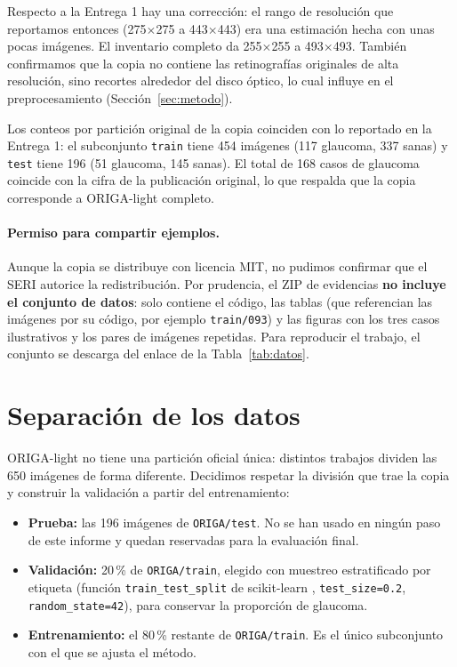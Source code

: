 \documentclass[pdflatex,sn-mathphys-num]{sn-jnl}%
\theoremstyle{thmstyleone}%
\theoremstyle{thmstyletwo}%
\theoremstyle{thmstylethree}%
\begin{document}
Respecto a la Entrega 1 hay una corrección: el rango de resolución que reportamos entonces (275$\times$275 a 443$\times$443) era una estimación hecha con unas pocas imágenes. El inventario completo da 255$\times$255 a 493$\times$493. También confirmamos que la copia no contiene las retinografías originales de alta resolución, sino recortes alrededor del disco óptico, lo cual influye en el preprocesamiento (Sección~\ref{sec:metodo}).

Los conteos por partición original de la copia coinciden con lo reportado en la Entrega 1: el subconjunto \texttt{train} tiene 454 imágenes (117 glaucoma, 337 sanas) y \texttt{test} tiene 196 (51 glaucoma, 145 sanas). El total de 168 casos de glaucoma coincide con la cifra de la publicación original, lo que respalda que la copia corresponde a ORIGA-light completo.

\paragraph{Permiso para compartir ejemplos.} Aunque la copia se distribuye con licencia MIT, no pudimos confirmar que el SERI autorice la redistribución. Por prudencia, el ZIP de evidencias \textbf{no incluye el conjunto de datos}: solo contiene el código, las tablas (que referencian las imágenes por su código, por ejemplo \texttt{train/093}) y las figuras con los tres casos ilustrativos y los pares de imágenes repetidas. Para reproducir el trabajo, el conjunto se descarga del enlace de la Tabla~\ref{tab:datos}.

\section{Separación de los datos}\label{sec:particion}

ORIGA-light no tiene una partición oficial única: distintos trabajos dividen las 650 imágenes de forma diferente. Decidimos respetar la división que trae la copia y construir la validación a partir del entrenamiento:

\begin{itemize}
\item \textbf{Prueba:} las 196 imágenes de \texttt{ORIGA/test}. No se han usado en ningún paso de este informe y quedan reservadas para la evaluación final.
\item \textbf{Validación:} 20\,\% de \texttt{ORIGA/train}, elegido con muestreo estratificado por etiqueta (función \texttt{train\_test\_split} de scikit-learn \cite{pedregosa2011scikit}, \texttt{test\_size=0.2}, \texttt{random\_state=42}), para conservar la proporción de glaucoma.
\item \textbf{Entrenamiento:} el 80\,\% restante de \texttt{ORIGA/train}. Es el único subconjunto con el que se ajusta el método.
\end{itemize}
\end{document}
